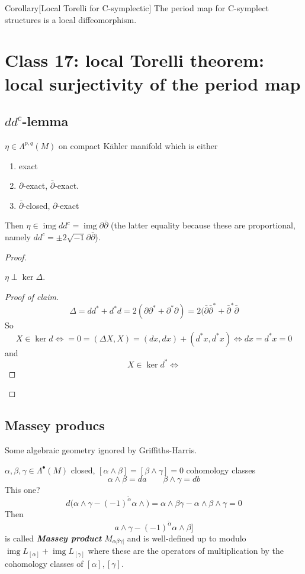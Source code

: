 \begin{thing8}{Corollary}[Local Torelli for C-symplectic]\leavevmode
	The period map for C-symplect structures is a local diffeomorphism.
\end{thing8}

\section{Class 17: local Torelli theorem: local surjectivity of the period map}

\subsection{$dd^c$-lemma}

\begin{thm}[$d d^c$-lemma]\leavevmode
	$\eta\in\Lambda^{p,q}(M)$ on compact  Kähler manifold which is either
	\begin{enumerate}[label=\alph*.]
		\item exact
		 \item $\partial$-exact, $\bar\partial$-exact.
		\item $\bar\partial$-closed, $\partial$-exact
	\end{enumerate}
	Then $\eta\in\operatorname{img} d d^c=\operatorname{img} \partial \bar\partial$ (the latter equality because these are proportional, namely $d d^c=\pm 2 \sqrt{-1}\partial \bar\partial$).
\end{thm}

\begin{proof}\leavevmode
	\begin{claim}\leavevmode
		$\eta \perp \ker \Delta$.
	\end{claim}
	\begin{proof}[Proof of claim]\leavevmode
		\[\Delta=d d^*+d^*d=2(\partial \partial^*+\partial^*\partial)=2(\bar\partial \bar\partial^*+\bar\partial^*\bar\partial \]
		So 
		\[X\in\ker d\iff=0=(\Delta X,X)=(dx,dx)+(d^*x,d^*x)\iff dx=d^*x=0\]
		and
		\[X\in\ker d^* \iff\]
	\end{proof}
\end{proof}

\subsection{Massey producs}

Some algebraic geometry ignored by Griffiths-Harris.

\begin{defn}\leavevmode
	$\alpha,\beta,\gamma\in\Lambda^{\bullet}(M)$ closed, $[\alpha\wedge \beta]=[\beta\wedge \gamma]=0$ cohomology classes 
	\[\alpha\wedge \beta=da\qquad \beta\wedge \gamma=db\]
	{\color{2}This one?}
	\[d(\alpha\wedge \gamma- (-1)^{\tilde{\alpha}}\alpha\wedge \big)=\alpha\wedge \beta\gamma-\alpha\wedge \beta\wedge \gamma=0\]
	Then
	\[a\wedge \gamma-(-1)^{\tilde{\alpha}}\alpha\wedge \beta]\]
	is called \textit{\textbf{Massey product}} $M_{\alpha \beta \gamma|}$ and is well-defined up to modulo  $\operatorname{img} L_{[\alpha]}+\operatorname{img} L_{[\gamma]}$ where these are the operators of multiplication by the cohomology classes of $[\alpha],[\gamma]$.
\end{defn}

